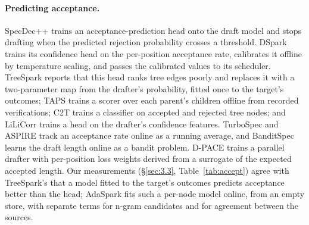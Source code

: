 \documentclass[10pt,twocolumn,letterpaper]{article}
\begin{document}
\paragraph{Predicting acceptance.} SpecDec++ \cite{huang2025specdec} trains an acceptance-prediction head onto the draft model and stops drafting when the predicted rejection probability crosses a threshold. DSpark \cite{cheng2026dspark} trains its confidence head on the per-position acceptance rate, calibrates it offline by temperature scaling, and passes the calibrated values to its scheduler. TreeSpark \cite{zhou2026treespark} reports that this head ranks tree edges poorly and replaces it with a two-parameter map from the drafter's probability, fitted once to the target's outcomes; TAPS \cite{wang2026taps} trains a scorer over each parent's children offline from recorded verifications; C2T \cite{huo2025c2t} trains a classifier on accepted and rejected tree nodes; and LiLiCorr \cite{rusanovsky2026lilicorr} trains a head on the drafter's confidence features. TurboSpec \cite{liu2024turbospec} and ASPIRE \cite{ziashahabi2026aspire} track an acceptance rate online as a running average, and BanditSpec \cite{hou2025banditspec} learns the draft length online as a bandit problem. D-PACE \cite{wu2026d} trains a parallel drafter with per-position loss weights derived from a surrogate of the expected accepted length. Our measurements (\S\ref{sec:3.3}, Table~\ref{tab:accept}) agree with TreeSpark's that a model fitted to the target's outcomes predicts acceptance better than the head; AdaSpark fits such a per-node model online, from an empty store, with separate terms for n-gram candidates and for agreement between the sources.
\end{document}
